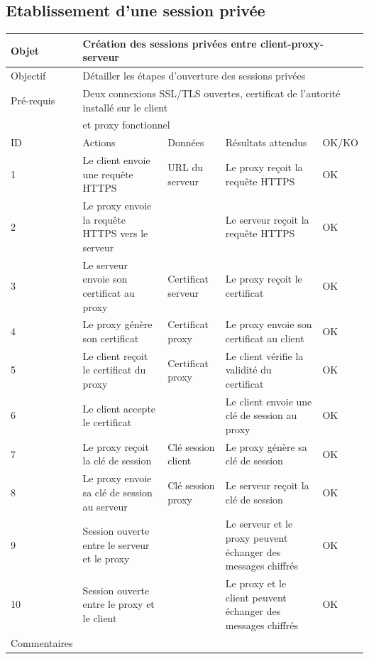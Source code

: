 \documentclass[a4paper,11pt,french]{article}
\begin{document}
\newpage

\subsection{Etablissement d'une session privée}

\begin{tabular}{|m{2.5cm}|m{4cm}|m{3cm}|m{3.5cm}|m{2cm}|}
\hline 
\rowcolor{Blue} Objet & \multicolumn{4}{|l|}{Création des sessions privées entre client-proxy-serveur} \\ 
\hline 
\rowcolor{Blue} Objectif & \multicolumn{4}{|l|}{Détailler les étapes d'ouverture des sessions privées} \\ 
\hline 
\rowcolor{Blue} Pré-requis & \multicolumn{4}{|l|}{Deux connexions SSL/TLS ouvertes, certificat de l'autorité installé sur le client} \\ 
\rowcolor{Blue} & \multicolumn{4}{|l|}{et proxy fonctionnel} \\
\hline
\rowcolor{Orange} ID & Actions & Données & Résultats attendus & OK/KO \\ 
\hline 
1 & Le client envoie une requête HTTPS & URL du serveur & Le proxy reçoit la requête HTTPS & OK \\ 
\hline
2 & Le proxy envoie la requête HTTPS vers le serveur & & Le serveur reçoit la requête HTTPS & OK\\
\hline
3 & Le serveur envoie son certificat au proxy & Certificat serveur & Le proxy reçoit le certificat & OK\\
\hline 
4 & Le proxy génère son certificat & Certificat proxy & Le proxy envoie son certificat au client & OK\\
\hline
5 & Le client reçoit le certificat du proxy & Certificat proxy & Le client vérifie la 
validité du certificat & OK\\
\hline
6 & Le client accepte le certificat & & Le client envoie une clé de session au 
proxy & OK\\
\hline
7 & Le proxy reçoit la clé de session & Clé session client & Le proxy génère sa clé de session & OK\\
\hline
8 & Le proxy envoie sa clé de session au serveur & Clé session proxy & Le serveur 
reçoit la clé de session & OK\\
\hline
9 & Session ouverte entre le serveur et le proxy & & Le serveur et le proxy 
peuvent échanger des messages chiffrés & OK \\
\hline
10 & Session ouverte entre le proxy et le client & & Le proxy et le client 
peuvent échanger des messages chiffrés & OK\\
\hline
Commentaires & \multicolumn{4}{|l|}{} \\ 
\hline
\end{tabular}
\end{document}
